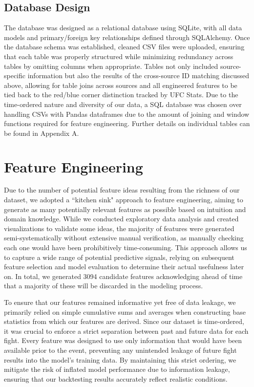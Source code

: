 \documentclass[12pt,twoside]{report}
\begin{document}
\subsection{Database Design}

The database was designed as a relational database using SQLite, with all data models and primary/foreign key relationships defined through SQLAlchemy. Once the database schema was established, cleaned CSV files were uploaded, ensuring that each table was properly structured while minimizing redundancy across tables by omitting columns when appropriate. Tables not only included source-specific information but also the results of the cross-source ID matching discussed above, allowing for table joins across sources and all engineered features to be tied back to the red/blue corner distinction tracked by UFC Stats. Due to the time-ordered nature and diversity of our data, a SQL database was chosen over handling CSVs with Pandas dataframes due to the amount of joining and window functions required for feature engineering. Further details on individual tables can be found in Appendix A.

\section{Feature Engineering}

Due to the number of potential feature ideas resulting from the richness of our dataset, we adopted a ``kitchen sink" approach to feature engineering, aiming to generate as many potentially relevant features as possible based on intuition and domain knowledge. While we conducted exploratory data analysis and created visualizations to validate some ideas, the majority of features were generated semi-systematically without extensive manual verification, as manually checking each one would have been prohibitively time-consuming. This approach allows us to capture a wide range of potential predictive signals, relying on subsequent feature selection and model evaluation to determine their actual usefulness later on. In total, we generated 3094 candidate features acknowledging ahead of time that a majority of these will be discarded in the modeling process.

To ensure that our features remained informative yet free of data leakage, we primarily relied on simple cumulative sums and averages when constructing base statistics from which our features are derived. Since our dataset is time-ordered, it was crucial to enforce a strict separation between past and future data for each fight. Every feature was designed to use only information that would have been available prior to the event, preventing any unintended leakage of future fight results into the model's training data. By maintaining this strict ordering, we mitigate the risk of inflated model performance due to information leakage, ensuring that our backtesting results accurately reflect realistic conditions.
\end{document}
